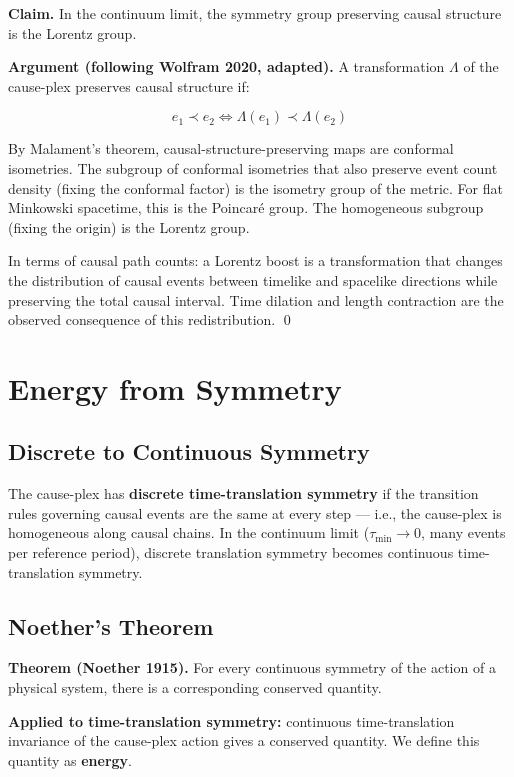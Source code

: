 \documentclass[11pt]{article}
\theoremstyle{definition}
\theoremstyle{remark}
\begin{document}
\textbf{Claim.} In the continuum limit, the symmetry group preserving
causal structure is the Lorentz group.

\textbf{Argument (following Wolfram 2020, adapted).} A transformation
\(\Lambda\) of the cause-plex preserves causal structure if:

\[e_1 \prec e_2 \iff \Lambda(e_1) \prec \Lambda(e_2)\]

By Malament's theorem, causal-structure-preserving maps are conformal
isometries. The subgroup of conformal isometries that also preserve
event count density (fixing the conformal factor) is the isometry group
of the metric. For flat Minkowski spacetime, this is the Poincaré group.
The homogeneous subgroup (fixing the origin) is the Lorentz group.

In terms of causal path counts: a Lorentz boost is a transformation that
changes the distribution of causal events between timelike and spacelike
directions while preserving the total causal interval. Time dilation and
length contraction are the observed consequence of this redistribution.
\qed

\medskip

\section{Energy from Symmetry}\label{energy-from-symmetry}

\subsection{Discrete to Continuous
Symmetry}\label{discrete-to-continuous-symmetry}

The cause-plex has \textbf{discrete time-translation symmetry} if the
transition rules governing causal events are the same at every step ---
i.e., the cause-plex is homogeneous along causal chains. In the
continuum limit (\(\tau_{\min} \to 0\), many events per reference
period), discrete translation symmetry becomes continuous
time-translation symmetry.

\subsection{Noether's Theorem}\label{noethers-theorem}

\textbf{Theorem (Noether 1915).} For every continuous symmetry of the
action of a physical system, there is a corresponding conserved
quantity.

\textbf{Applied to time-translation symmetry:} continuous
time-translation invariance of the cause-plex action gives a conserved
quantity. We define this quantity as \textbf{energy}.
\end{document}

